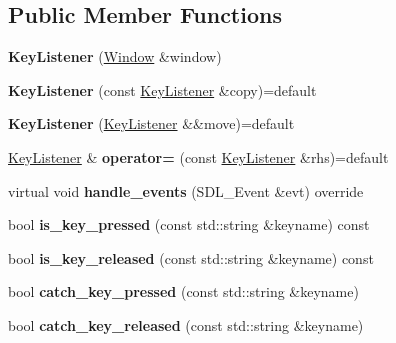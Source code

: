 \subsection*{Public Member Functions}
\begin{DoxyCompactItemize}
\item 
\mbox{\label{class_key_listener_ab916f7cf930c921ab0a7979fa7234056}} 
{\bfseries Key\+Listener} (\mbox{\hyperlink{class_window}{Window}} \&window)
\item 
\mbox{\label{class_key_listener_a77e112bbf7e34dfb9c4d65ad96496389}} 
{\bfseries Key\+Listener} (const \mbox{\hyperlink{class_key_listener}{Key\+Listener}} \&copy)=default
\item 
\mbox{\label{class_key_listener_aebb1bc88efca72921f3740911c20fa30}} 
{\bfseries Key\+Listener} (\mbox{\hyperlink{class_key_listener}{Key\+Listener}} \&\&move)=default
\item 
\mbox{\label{class_key_listener_a95a92bca7d105dd906be81613798cdd2}} 
\mbox{\hyperlink{class_key_listener}{Key\+Listener}} \& {\bfseries operator=} (const \mbox{\hyperlink{class_key_listener}{Key\+Listener}} \&rhs)=default
\item 
\mbox{\label{class_key_listener_a2a7de72fe731c72f125560060db2c765}} 
virtual void {\bfseries handle\+\_\+events} (S\+D\+L\+\_\+\+Event \&evt) override
\item 
\mbox{\label{class_key_listener_ab83113043164890f27fea24bca103dd6}} 
bool {\bfseries is\+\_\+key\+\_\+pressed} (const std\+::string \&keyname) const
\item 
\mbox{\label{class_key_listener_ad2a4b0a94d69949b2bb8d83b3e937d80}} 
bool {\bfseries is\+\_\+key\+\_\+released} (const std\+::string \&keyname) const
\item 
\mbox{\label{class_key_listener_a55024ee26dd4ca72d4ce0b0c3b381235}} 
bool {\bfseries catch\+\_\+key\+\_\+pressed} (const std\+::string \&keyname)
\item 
\mbox{\label{class_key_listener_a01406b86c1607891068a0b2f65305048}} 
bool {\bfseries catch\+\_\+key\+\_\+released} (const std\+::string \&keyname)
\end{DoxyCompactItemize}
